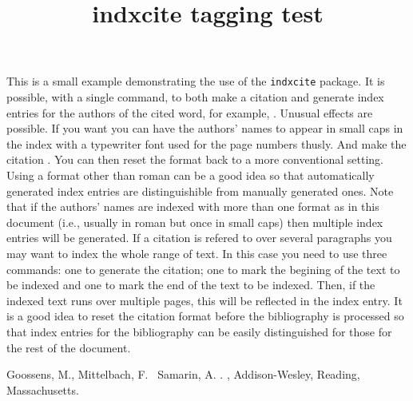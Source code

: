 \documentclass{article}
\title{indxcite tagging test}
\begin{document}

This is a small example demonstrating the use of the \texttt{indxcite}
package.
It is possible, with a single command, to both make a citation and
generate index entries for the authors of the cited word,
for example, .
\pagebreak
Unusual effects are possible. If you want you can have the authors’ names to
appear in small caps in the index with a typewriter font used for the
page numbers thusly.
And make the citation .
You can then reset the format back to a more conventional setting.
Using a format other than roman can be a good idea so that automatically
generated index entries are distinguishible from manually generated
ones.
Note that if the authors’ names are indexed with more than one format
as in this document (i.e., usually in roman but once in small caps) then
multiple index entries will be generated.
\pagebreak
{}
If a citation is refered to over several paragraphs you may want to
index the whole range of text.
In this case you need to use three commands: one to generate the
citation\cite{latexcomp}; one to mark the begining of the text to
be indexed and one to mark the end of the text to be indexed.
\pagebreak
Then, if the indexed text runs over multiple pages, this will be
reflected in the index entry.
It is a good idea to reset the citation format before the bibliography
is processed so that index entries for the bibliography can be easily
distinguished for those for the rest of the document.
\begin{thebibliography}{xx}
Goossens, M., Mittelbach, F. \harvardand\ Samarin, A. \harvardyearleft
1993\harvardyearright .
, Addison-Wesley, Reading,
Massachusetts.\indexcite{latexcomp}
\end{thebibliography}
\printindex[aut]
\end{document}
